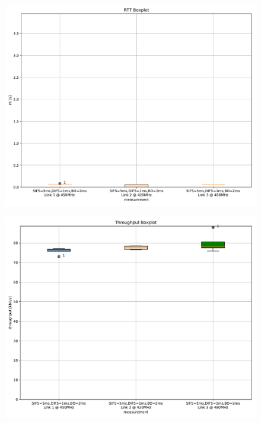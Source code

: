 \documentclass{article}
\begin{document}
\begin{figure}
	\includegraphics[width=\textwidth]{rb_low_single/boxplot/rtt_boxplot}
\end{figure}

\begin{figure}
	\includegraphics[width=\textwidth]{rb_low_single/boxplot/throughput_boxplot}
\end{figure}
\end{document}

